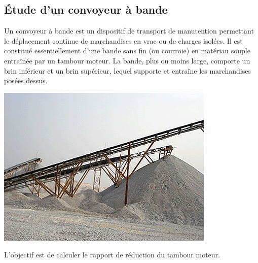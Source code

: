 \documentclass[10pt,oneside]{article}
\begin{document}
\subsection{Étude d'un convoyeur à bande}
\begin{exemple}
\begin{minipage}[c]{.55\linewidth}
Un convoyeur à bande est un dispositif de transport de manutention permettant le déplacement continue de marchandises en vrac ou de charges isolées. Il est constitué essentiellement d'une bande sans fin (ou courroie) en matériau souple entraînée par un tambour moteur. La bande, plus ou moins large, comporte un brin inférieur et un brin supérieur, lequel supporte et entraîne les marchandises posées dessus.
\end{minipage}\hfill
\begin{minipage}[c]{.4\linewidth}
\begin{center}
\includegraphics[width=.9\textwidth]{png/fig02}
\end{center}
\end{minipage}
\end{exemple}

L'objectif est de calculer le rapport de réduction du tambour moteur. 
\end{document}
